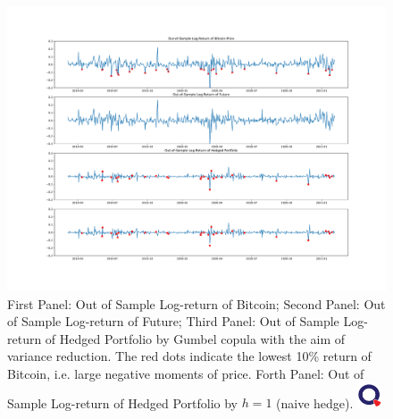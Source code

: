 \begin{figure}[th]
   \centering
   \includegraphics[width=\textwidth]{_pics/OOSreturns_compare.pdf}
   \caption{First Panel: Out of Sample Log-return of Bitcoin; Second Panel: Out of Sample Log-return of Future;
   Third Panel: Out of Sample Log-return of Hedged Portfolio by Gumbel copula with the aim of variance reduction.
   The red dots indicate the lowest 10\% return of Bitcoin, i.e. large negative moments of price.
   Forth Panel: Out of Sample Log-return of Hedged Portfolio by $h=1$ (naive hedge).
   \href{http://www.quantlet.com/}{\includegraphics[width=20pt]{_pics/qletlogo_tr.png}}}
   \label{fig:Gumbel}
\end{figure}

